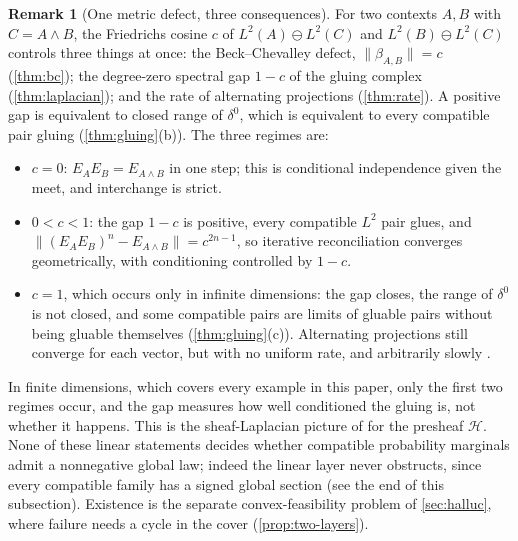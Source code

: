 \documentclass[11pt]{article}
\theoremstyle{definition}
\newtheorem{remark}[theorem]{Remark}
\begin{document}
\begin{remark}[One metric defect, three consequences]\label{rem:one-defect}
For two contexts $A,B$ with $C=A\wedge B$, the Friedrichs cosine $c$ of $L^2(A)\ominus L^2(C)$ and $L^2(B)\ominus L^2(C)$ controls three
things at once: the Beck--Chevalley defect, $\lVert\beta_{A,B}\rVert=c$ (\cref{thm:bc}); the degree-zero spectral gap $1-c$ of the
gluing complex (\cref{thm:laplacian}); and the rate of alternating projections (\cref{thm:rate}). A positive gap is equivalent to closed
range of $\delta^0$, which is equivalent to every compatible pair gluing (\cref{thm:gluing}(b)). The three regimes are:
\begin{itemize}
\item $c=0$: $E_AE_B=E_{A\wedge B}$ in one step; this is conditional independence given the meet, and interchange is strict.
\item $0<c<1$: the gap $1-c$ is positive, every compatible $L^2$ pair glues, and $\lVert(E_AE_B)^n-E_{A\wedge B}\rVert=c^{2n-1}$, so
  iterative reconciliation converges geometrically, with conditioning controlled by $1-c$.
\item $c=1$, which occurs only in infinite dimensions: the gap closes, the range of $\delta^0$ is not closed, and some compatible pairs
  are limits of gluable pairs without being gluable themselves (\cref{thm:gluing}(c)). Alternating projections still converge for each
  vector, but with no uniform rate, and arbitrarily slowly \cite{BauschkeDeutschHundal2009}.
\end{itemize}
In finite dimensions, which covers every example in this paper, only the first two regimes occur, and the gap measures how well
conditioned the gluing is, not whether it happens. This is the sheaf-Laplacian picture of \cite{HansenGhrist2019} for the presheaf
$\mathcal H$. None of these linear statements decides whether compatible probability marginals admit a nonnegative global law; indeed
the linear layer never obstructs, since every compatible family has a signed global section (see the end of this subsection). Existence
is the separate convex-feasibility problem of \cref{sec:halluc}, where failure needs a cycle in the cover (\cref{prop:two-layers}).
\end{remark}
\end{document}
